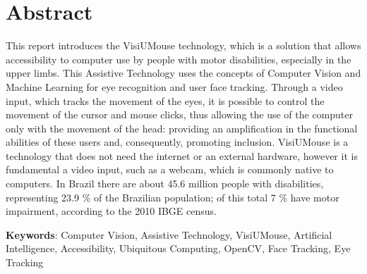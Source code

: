 \chapter*{Abstract}
\onehalfspacing
\noindent This report introduces the VisiUMouse technology, which is a solution that allows accessibility to computer use by people with motor disabilities, especially in the upper limbs. This Assistive Technology uses the concepts of Computer Vision and Machine Learning for eye recognition and user face tracking. Through a video input, which tracks the movement of the eyes, it is possible to control the movement of the cursor and mouse clicks, thus allowing the use of the computer only with the movement of the head: providing an amplification in the functional abilities of these users and, consequently, promoting inclusion. VisiUMouse is a technology that does not need the internet or an external hardware, however it is fundamental a video input, such as a webcam, which is commonly native to computers. In Brazil there are about 45.6 million people with disabilities, representing 23.9 \% of the Brazilian population; of this total 7 \% have motor impairment, according to the 2010 IBGE census.

% 
% 
% 


\noindent
\onehalfspacing
\textbf{Keywords}: Computer Vision, Assistive Technology, VisiUMouse, Artificial Intelligence, Accessibility, Ubiquitous Computing, OpenCV, Face Tracking, Eye Tracking